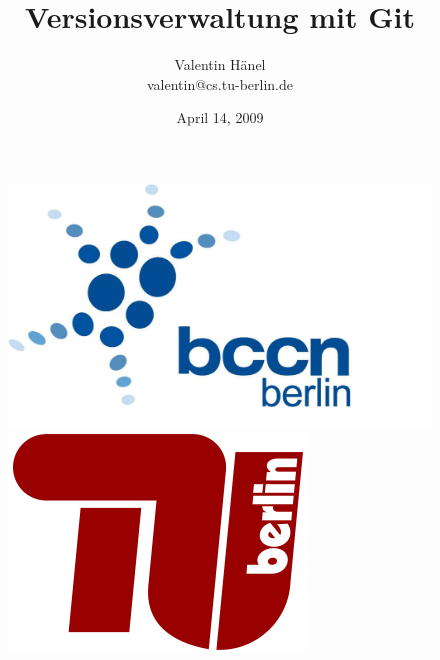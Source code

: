 \documentclass[ hyperref={colorlinks=true,filecolor=blue,linkcolor=blue,urlcolor=blue}]{beamer}
\author{Valentin H\"anel\\
        valentin@cs.tu-berlin.de}
\institute{Technische Universität Berlin \\
Bernstein Center for Computational Neuroscience Berlin}
\title{Versionsverwaltung mit Git }
\date{April 14, 2009}
\begin{document}
\begin{frame}
	\titlepage
    \begin{figure}
	    \includegraphics[scale=0.05]{BCCN_logo_berlin.pdf}
	    \includegraphics[scale=0.14]{tu_logo.png}
    \end{figure}
\end{frame}


\end{document}
